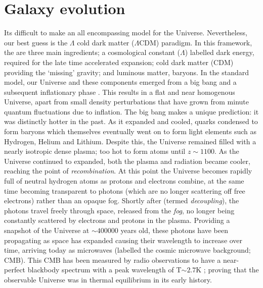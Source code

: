 \section{Galaxy evolution} \label{sec:gal_evo_intro}
Its difficult to make an all encompassing model for the Universe. Nevertheless, our best guess is the $\Lambda$ cold dark matter ($\Lambda$CDM) paradigm. In this framework, the are three main ingredients; a cosmological constant ($\Lambda$) labelled dark energy, required for the late time accelerated expansion; cold dark matter (CDM) providing the `missing' gravity; and luminous matter, baryons. In the standard model, our Universe and these components emerged from a big bang and a subsequent inflationary phase \citep[epoch of accelerated expansion;][]{guth1981}. This results in a flat and near homogenous Universe, apart from small density perturbations that have grown from minute quantum fluctuations due to inflation. The big bang makes a unique prediction: it was distinctly hotter in the past. As it expanded and cooled, quarks condensed to form baryons which themselves eventually went on to form light elements such as Hydrogen, Helium and Lithium. Despite this, the Universe remained filled with a nearly isotropic dense plasma; too hot to form atoms until $z \sim 1100$. As the Universe continued to expanded, both the plasma and radiation became cooler, reaching the point of \textit{recombination}. At this point the Universe becomes rapidly full of neutral hydrogen atoms as protons and electrons combine, at the same time becoming transparent to photons (which are no longer scattering off free electrons) rather than an opaque fog. Shortly after (termed \textit{decoupling}), the photons travel freely through space, released from the \textit{fog}, no longer being constantly scattered by electrons and protons in the plasma. Providing a snapshot of the Universe at $\sim 400000$ years old, these photons have been propagating as space has expanded causing their wavelength to increase over time, arriving today as microwaves (labelled the cosmic microwave background; CMB). This CMB has been measured by radio observations to have a near-perfect blackbody spectrum with a peak wavelength of T$\sim 2.7$K \citep{planck2016xiii}; proving that the observable Universe was in thermal equilibrium in its early history.

